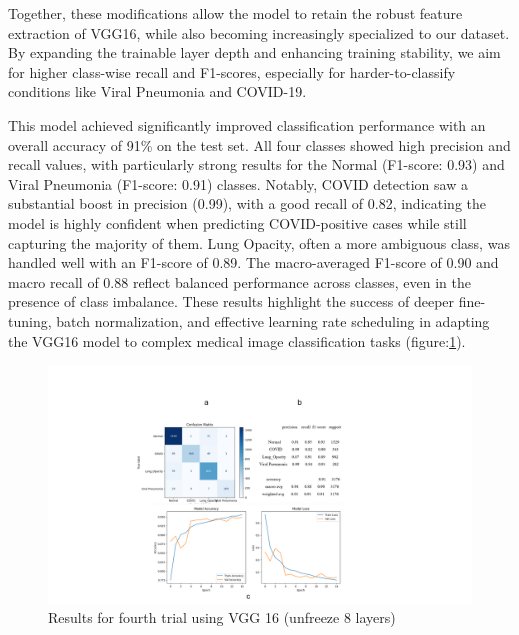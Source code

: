 \documentclass{article}
\begin{document}
Together, these modifications allow the model to retain the robust feature extraction of VGG16, while also becoming increasingly specialized to our dataset. By expanding the trainable layer depth and enhancing training stability, we aim for higher class-wise recall and F1-scores, especially for harder-to-classify conditions like Viral Pneumonia and COVID-19.

This model achieved significantly improved classification performance with an overall accuracy of 91\% on the test set. All four classes showed high precision and recall values, with particularly strong results for the Normal (F1-score: 0.93) and Viral Pneumonia (F1-score: 0.91) classes. Notably, COVID detection saw a substantial boost in precision (0.99), with a good recall of 0.82, indicating the model is highly confident when predicting COVID-positive cases while still capturing the majority of them. Lung Opacity, often a more ambiguous class, was handled well with an F1-score of 0.89. The macro-averaged F1-score of 0.90 and macro recall of 0.88 reflect balanced performance across classes, even in the presence of class imbalance. These results highlight the success of deeper fine-tuning, batch normalization, and effective learning rate scheduling in adapting the VGG16 model to complex medical image classification tasks (figure:\ref{fig:vgg16result4.png}).

\begin{figure}[h!] %
    \centering
    \includegraphics[width=1.0\linewidth]{vgg16-8.png}
    \caption{Results for fourth trial using VGG 16 (unfreeze 8 layers)}
    \label{fig:vgg16result4.png}
\end{figure}
\end{document}
